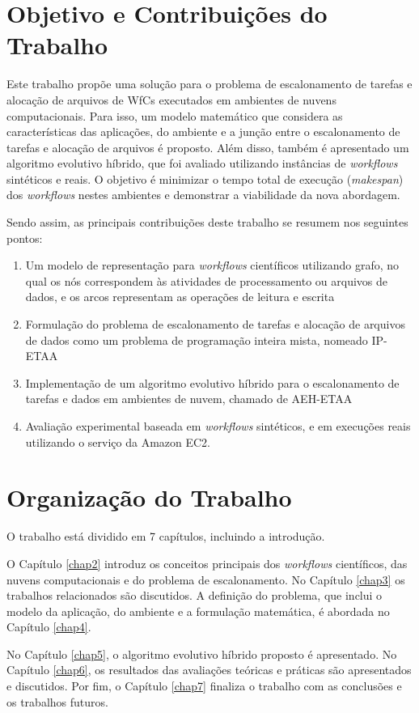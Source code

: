 \section{Objetivo e Contribuições do Trabalho}

Este trabalho propõe uma solução para o problema de escalonamento de tarefas e alocação de arquivos de WfCs executados em ambientes de nuvens computacionais. Para isso, um modelo matemático que considera as características das aplicações, do ambiente e a junção entre o escalonamento de tarefas e alocação de arquivos é proposto. Além disso, também é apresentado um algoritmo evolutivo híbrido, que foi avaliado utilizando instâncias de \textit{workflows} sintéticos e reais. O objetivo é minimizar o tempo total de execução (\textit{makespan}) dos \textit{workflows} nestes ambientes e demonstrar a viabilidade da nova abordagem.

Sendo assim, as principais contribuições deste trabalho se resumem nos seguintes pontos:
\begin{enumerate}
    \item Um modelo de representação para \textit{workflows} científicos utilizando grafo, no qual os nós correspondem às atividades de processamento ou arquivos de dados, e os arcos representam as operações de leitura e escrita
    \item Formulação do problema de escalonamento de tarefas e alocação de arquivos de dados como um problema de programação inteira mista, nomeado IP-ETAA
    \item Implementação de um algoritmo evolutivo híbrido para o escalonamento de tarefas e dados em ambientes de nuvem, chamado de AEH-ETAA
    \item Avaliação experimental baseada em \textit{workflows} sintéticos, e em execuções reais utilizando o serviço da Amazon EC2.
\end{enumerate}




\section{Organização do Trabalho}

O trabalho está dividido em 7 capítulos, incluindo a introdução.

O Capítulo \ref{chap2} introduz os conceitos principais dos \textit{workflows} científicos, das nuvens computacionais e do problema de escalonamento. No Capítulo \ref{chap3} os trabalhos relacionados são discutidos. A definição do problema, que inclui o modelo da aplicação, do ambiente e a formulação matemática, é abordada no Capítulo \ref{chap4}.

No Capítulo \ref{chap5}, o algoritmo evolutivo híbrido proposto é apresentado. No Capítulo \ref{chap6}, os resultados das avaliações teóricas e práticas são apresentados e discutidos. Por fim, o Capítulo \ref{chap7} finaliza o trabalho com as conclusões e os trabalhos futuros.



